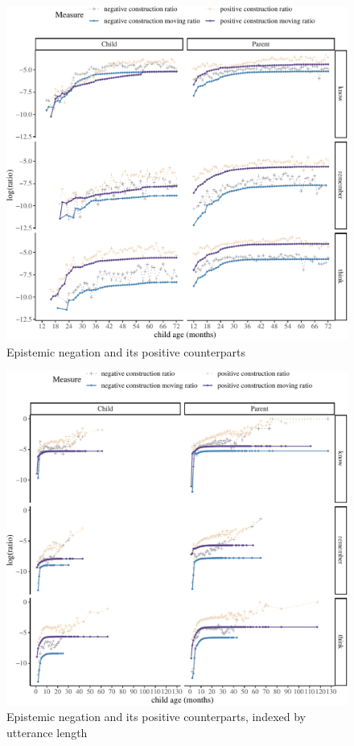 \documentclass[
  english,
  man,floatsintext]{apa6}
\begin{document}
\begin{figure}[H]

{\centering \includegraphics{neg_construction_article_files/figure-latex/epistemic-1} 

}

\caption{Epistemic negation and its positive counterparts}\label{fig:epistemic}
\end{figure}

\begin{figure}[H]

{\centering \includegraphics{neg_construction_article_files/figure-latex/epistemicul-1} 

}

\caption{Epistemic negation and its positive counterparts, indexed by utterance length}\label{fig:epistemicul}
\end{figure}
\end{document}
